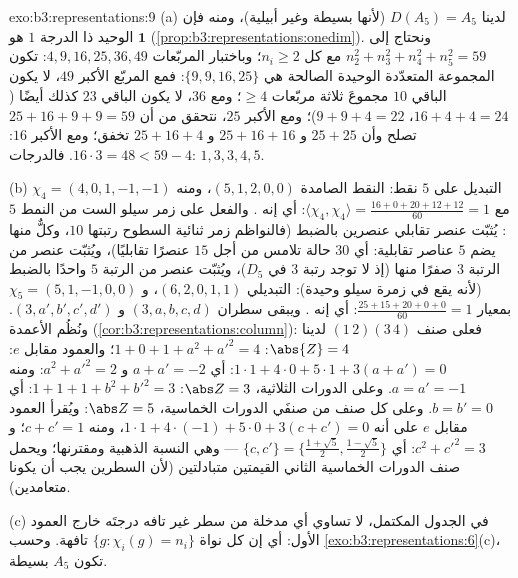 \begin{solution}{exo:b3:representations:9}
(a) لدينا $D(A_5) = A_5$ (لأنها بسيطة وغير أبيلية)، ومنه فإن
 الوحيد ذا الدرجة $1$ هو $\mathbf 1$ (\cref{prop:b3:representations:onedim}).
ونحتاج إلى $n_2^2 + n_3^2
+ n_4^2 + n_5^2 = 59$ مع كل $n_i \geq 2$؛ وباختبار المربّعات
$4, 9, 16, 25, 36, 49$: تكون المجموعة المتعدّدة الوحيدة الصالحة هي $\{9, 9, 16, 25\}$:
فمع المربّع الأكبر $49$، لا يكون الباقي $10$ مجموعَ ثلاثة
مربّعات $\geq 4$؛ ومع $36$، لا يكون الباقي $23$ كذلك أيضًا
($16 + 4 + 4 = 24$، $9 + 9 + 4 = 22$)؛ ومع الأكبر $25$، نتحقق من أن
$25 + 16 + 9 + 9 = 59$ تصلح وأن $25 +
25$ و $25 + 16 + 16$ و $25 + 16 + 4$ تخفق؛
ومع الأكبر $16$: $16\cdot3 = 48 < 59 - 4$. فالدرجات: $1, 3, 3, 4, 5$.

(b) التبديل على $5$ نقط: النقط الصامدة $(5, 1, 2, 0, 0)$، ومنه $\chi_4 = (4, 0, 1, -1, -1)$
مع $\langle\chi_4,\chi_4\rangle = \frac{16 + 0 + 20 + 12 + 12}{60}
= 1$: أي إنه . والفعل على زمر سيلو الست
من النمط $5$: يُثبّت عنصر تقابلي عنصرين بالضبط (فالنواظم زمر
ثنائية السطوح رتبتها $10$، وكلٌّ منها يضم $5$ عناصر تقابلية: أي
$30$ حالة تلامس من أجل $15$ عنصرًا تقابليًا)، ويُثبّت عنصر من
الرتبة $3$ صفرًا منها (إذ لا توجد رتبة $3$ في $D_5$)، ويُثبّت
عنصر من الرتبة $5$ واحدًا بالضبط (لأنه يقع في زمرة سيلو وحيدة):
 التبديلي $(6, 2, 0, 1, 1)$، و $\chi_5 =
(5, 1, -1, 0, 0)$ بمعيار $\frac{25 + 15 + 20 + 0 + 0}{60} =
1$: أي إنه . ويبقى سطران $(3, a, b, c, d)$ و $(3, a', b', c',
d')$. ونُظُم الأعمدة
(\cref{cor:b3:representations:column}): فعلى صنف $(1\,2)(3\,4)$ لدينا $\abs{Z} = 4$:
$1 + 0 + 1 + a^2 + a'^2 = 4$؛ والعمود مقابل $e$: $1\cdot1 + 4\cdot 0 + 5\cdot1 + 3(a + a') =
0$: أي $a + a' = -2$
و $a^2 + a'^2 = 2$: ومنه $a = a' = -1$. وعلى الدورات الثلاثية،
$\abs Z = 3$: $1 + 1 + 1 + b^2 + b'^2 = 3$: أي $b = b'
= 0$. وعلى كل صنف من صنفَي
الدورات الخماسية، $\abs Z = 5$: ويُقرأ العمود مقابل $e$ على أنه
$1\cdot 1 + 4\cdot(-1) + 5\cdot 0 + 3(c + c') = 0$، ومنه $c + c' = 1$؛ و $c^2 + c'^2 = 3$: أي $\{c, c'\} = \bigl\{\frac{1+\sqrt5}2,
\frac{1-\sqrt5}2\bigr\}$ ---
وهي النسبة الذهبية ومقترنها؛ ويحمل صنف الدورات الخماسية الثاني
القيمتين متبادلتين (لأن السطرين يجب أن يكونا متعامدين).

(c) في الجدول المكتمل، لا تساوي أي مدخلة من سطر غير تافه درجتَه
خارج العمود الأول: أي إن كل نواة $\{g :
\chi_i(g) = n_i\}$ تافهة. وحسب
\cref{exo:b3:representations:6}(c)، تكون $A_5$ بسيطة.
\end{solution}

